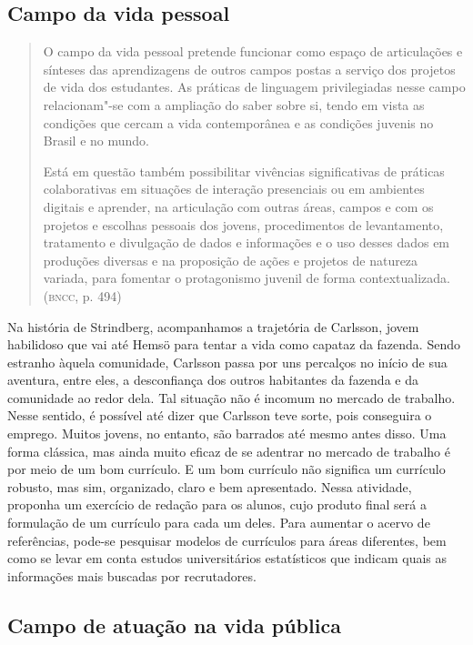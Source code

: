 \documentclass[12pt]{extarticle}
\begin{document}
\subsection{Campo da vida pessoal}

\begin{quote}
O campo da vida pessoal pretende funcionar como espaço de articulações
e sínteses das aprendizagens de outros campos postas a serviço dos
projetos de vida dos estudantes. As práticas de linguagem privilegiadas
nesse campo relacionam"-se com a ampliação do saber sobre si, tendo em
vista as condições que cercam a vida contemporânea e as condições
juvenis no Brasil e no mundo.

Está em questão também possibilitar vivências significativas de práticas
colaborativas em situações de interação presenciais ou em ambientes
digitais e aprender, na articulação com outras áreas, campos e com os
projetos e escolhas pessoais dos jovens, procedimentos de levantamento,
tratamento e divulgação de dados e informações e o uso desses dados em
produções diversas e na proposição de ações e projetos de natureza
variada, para fomentar o protagonismo juvenil de forma
contextualizada. (\textsc{bncc}, p. 494)
\end{quote}

Na história de Strindberg, acompanhamos a trajetória de Carlsson,
jovem habilidoso que vai até Hemsö para tentar a vida como capataz da
fazenda. Sendo estranho àquela comunidade, Carlsson passa por uns
percalços no início de sua aventura, entre eles, a desconfiança dos
outros habitantes da fazenda e da comunidade ao redor dela. Tal
situação não é incomum no mercado de trabalho. Nesse sentido, é
possível até dizer que Carlsson teve sorte, pois conseguira o emprego.
Muitos jovens, no entanto, são barrados até mesmo antes disso. Uma
forma clássica, mas ainda muito eficaz de se adentrar no mercado de
trabalho é por meio de um bom currículo. E um bom currículo não
significa um currículo robusto, mas sim, organizado, claro e bem
apresentado. Nessa atividade, proponha um exercício de redação para os
alunos, cujo produto final será a formulação de um currículo para cada
um deles. Para aumentar o acervo de referências, pode-se pesquisar
modelos de currículos para áreas diferentes, bem como se levar em
conta estudos universitários estatísticos que indicam quais as
informações mais buscadas por recrutadores.

\subsection{Campo de atuação na vida pública}
\end{document}
